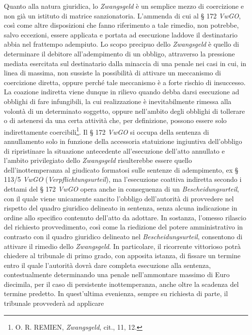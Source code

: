 \documentclass[12pt,it,a4paper,]{report}
\begin{document}
Quanto alla natura giuridica, lo \emph{Zwangsgeld} è un semplice mezzo
di coercizione e non già un istituto di matrice sanzionatoria. L'ammenda
di cui al § 172 \emph{VwGO}, così come altre disposizioni che fanno
riferimento a tale rimedio, non potrebbe, salvo eccezioni, essere
applicata e portata ad esecuzione laddove il destinatario abbia nel
frattempo adempiuto. Lo scopo precipuo dello \emph{Zwangsgeld} è quello
di determinare il debitore all'adempimento di un obbligo, attraverso la
pressione mediata esercitata sul destinatario dalla minaccia di una
penale nei casi in cui, in linea di massima, non sussiste la possibilità
di attivare un meccanismo di coercizione diretta, oppure perché tale
meccanismo è a forte rischio di insuccesso. La coazione indiretta viene
dunque in rilievo quando debba darsi esecuzione ad obblighi di fare
infungibili, la cui realizzazione è inevitabilmente rimessa alla volontà
di un determinato soggetto, oppure nell'ambito degli obblighi di
tollerare o di astenersi da una certa attività che, per definizione,
possono essere solo indirettamente coercibili\footnote{O. R. REMIEN,
  \emph{Zwangsgeld}, cit., 11, 12.}. Il § 172 \emph{VwGO} si occupa
della sentenza di annullamento solo in funzione della accessoria
statuizione ingiuntiva dell'obbligo di ripristinare la situazione
antecedente all'esecuzione dell'atto annullato e l'ambito privilegiato
dello \emph{Zwangsgeld} risulterebbe essere quello dell'inottemperanza
al giudicato formatosi sulle sentenze di adempimento, ex § 113/5
\emph{VwGO} (\emph{Verpflichtungsurteil}), ma l'esecuzione coattiva
indiretta secondo i dettami del § 172 \emph{VwGO} opera anche in
conseguenza di un \emph{Bescheidungsurteil}, con il quale viene
unicamente sancito l'obbligo dell'autorità di provvedere nel rispetto
del quadro giuridico delineato in sentenza, senza alcuna indicazione in
ordine allo specifico contenuto dell'atto da adottare. In sostanza,
l'omesso rilascio del richiesto provvedimento, così come la riedizione
del potere amministrativo in contrasto con il quadro giuridico delineato
nel \emph{Bescheidungsurteil}, consentono di attivare il rimedio dello
\emph{Zwangsgeld}. In particolare, il ricorrente vittorioso potrà
chiedere al tribunale di primo grado, con apposita istanza, di fissare
un termine entro il quale l'autorità dovrà dare completa esecuzione alla
sentenza, contestualmente determinando una penale nell'ammontare massimo
di Euro diecimila, per il caso di persistente inottemperanza, anche
oltre la scadenza del termine predetto. In quest'ultima evenienza,
sempre su richiesta di parte, il tribunale provvederà ad applicare
\end{document}
